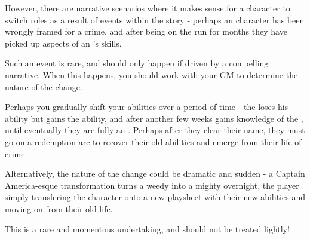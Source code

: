 However, there are narrative scenarios where it makes sense for a character to switch roles as a result of events within the story - perhaps an  character has been wrongly framed for a crime, and after being on the run for months they have picked up aspects of an 's skills. 

Such an event is rare, and should only happen if driven by a compelling narrative. When this happens, you should work with your GM to determine the nature of the change. 

Perhaps you gradually shift your abilities over a period of time - the  loses his  ability but gains the  ability, and after another few weeks gains knowledge of the , until eventually they are fully an . Perhaps after they clear their name, they must go on a redemption arc to recover their old abilities and emerge from their life of crime.

Alternatively, the nature of the change could be dramatic and sudden - a Captain America-esque transformation turns a weedy  into a mighty  overnight, the player simply transfering the character onto a new playsheet with their new abilities and moving on from their old life. 

This is a rare and momentous undertaking, and should not be treated lightly!


